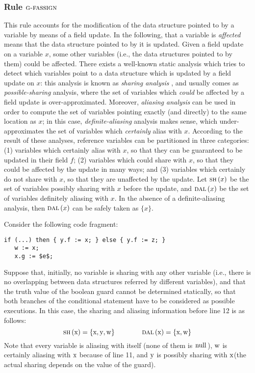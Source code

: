 \documentclass[prodmode,acmtocl]{acmsmall}
\newcommand{\0}{\mbox{\bf 0}}
\newcommand{\CODE}[1]{\ensuremath{\mbox{\lstinline!#1!}\xspace}\xspace}
\def\xx{\CODE{x}}
\def\yy{\CODE{y}}
\def\ww{\CODE{w}}
\newcommand{\GRULENAME}[1]{\textsc{g-#1}}
\newcommand{\SHARE}[1]{\textsc{sh}\left(#1\right)}
\newcommand{\DALIAS}[1]{\textsc{dal}\left(#1\right)}
\begin{document}
\subsubsection{Rule $\GRULENAME{fassign}$}

This rule accounts for the modification of the data structure pointed
to by a variable by means of a field update.  In the following, that a
variable is \emph{affected} means that the data structure pointed to
by it is updated.  Given a field update on a variable $x$, some other
variables (i.e., the data structures pointed to by them) could be
affected.  There exists a well-known static analysis which tries to
detect which variables point to a data structure which is updated by a
field update on $x$: this analysis is known as \emph{sharing analysis}
\cite{DBLP:conf/sas/SecciS05,ZanardiniG15sh}, and usually comes as
\emph{possible-sharing} analysis, where the set of variables which
\emph{could} be affected by a field update is over-approximated.
Moreover, \emph{aliasing analysis} \cite{Hind2001} can be used in
order to compute the set of variables pointing exactly (and directly)
to the same location as $x$; in this case, \emph{definite-aliasing}
analysis makes sense, which under-approximates the set of variables
which
\emph{certainly} alias with $x$.  According to the result of these
analyses, reference variables can be partitioned in three categories:
(1) variables which certainly alias with $x$, so that they can be
guaranteed to be updated in their field $f$; (2) variables which could
share with $x$, so that they could be affected by the update in many
ways; and (3) variables which certainly do not share with $x$, so that
they are unaffected by the update.  Let $\SHARE{x}$ be the set of
variables possibly sharing with $x$ before the update, and
$\DALIAS{x}$ be the set of variables definitely aliasing with $x$.  In
the absence of a definite-aliasing analysis, then $\DALIAS{x}$ can be
safely taken as $\{x\}$.

\begin{example}
  \label{ex:sharingFlavours}
  Consider the following code fragment:
  {\em \begin{lstlisting}[firstnumber=10]
   if (...) then { y.f := x; } else { y.f := z; }
   w := x;
   x.g := $e$;
  \end{lstlisting}}

  \noindent Suppose that, initially, no variable is sharing with any
  other variable (i.e., there is no overlapping between data
  structures referred by different variables), and that the truth
  value of the boolean guard cannot be determined statically, so that
  both branches of the conditional statement have to be considered as
  possible executions.  In this case, the sharing and aliasing
  information before line 12 is as follows: \[ \SHARE{\mbox{\xx}} = \{
  \mbox{\xx}, \mbox{\yy}, \mbox{\ww} \} \qquad\qquad
  \DALIAS{\mbox{\xx}} = \{ \mbox{\xx},\mbox{\ww} \} \] Note that every
  variable is aliasing with itself (none of them is \CODE{null}), \ww
  is certainly aliasing with \xx because of line 11, and \yy is
  possibly sharing with \xx (the actual sharing depends on the value
  of the guard).
\end{example}
\end{document}
